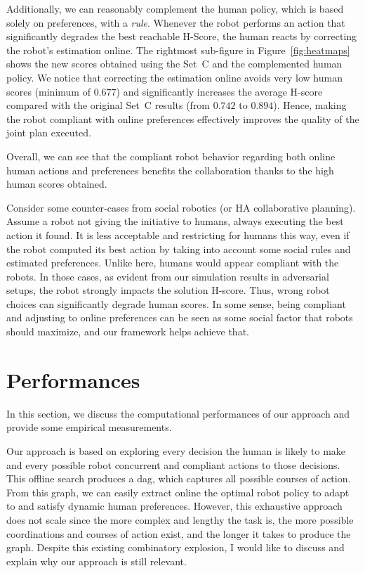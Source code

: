 Additionally, we can reasonably complement the human policy, which is based solely on preferences, with a \textit{rule}. Whenever the robot performs an action that significantly degrades the best reachable H-Score, the human reacts by correcting the robot's estimation online.
The rightmost sub-figure in Figure~\ref{fig:heatmaps} shows the new scores obtained using the Set~C and the complemented human policy. 
We notice that correcting the estimation online avoids very low human scores (minimum of $0.677$) and significantly increases the average H-score compared with the original Set~C results (from $0.742$ to $0.894$). Hence, making the robot compliant with online preferences effectively improves the quality of the joint plan executed.

Overall, we can see that the compliant robot behavior regarding both online human actions and preferences benefits the collaboration thanks to the high human scores obtained.

Consider some counter-cases from social robotics (or HA collaborative planning). Assume a robot not giving the initiative to humans, always executing the best action it found. 
It is less acceptable and restricting for humans this way, even if the robot computed its best action by taking into account some social rules and estimated preferences. 
Unlike here, humans would appear compliant with the robots. 
In those cases, as evident from our simulation results in adversarial setups, the robot strongly impacts the solution H-score. Thus, wrong robot choices can significantly degrade human scores. In some sense, being compliant and adjusting to online preferences can be seen as some social factor that robots should maximize, and our framework helps achieve that.

\section{Performances}


In this section, we discuss the computational performances of our approach and provide some empirical measurements. 

Our approach is based on exploring every decision the human is likely to make and every possible robot concurrent and compliant actions to those decisions. 
This offline search produces a \acrfull{dag}, which captures all possible courses of action. From this graph, we can easily extract online the optimal robot policy to adapt to and satisfy dynamic human preferences. However, this exhaustive approach does not scale since the more complex and lengthy the task is, the more possible coordinations and courses of action exist, and the longer it takes to produce the graph. Despite this existing combinatory explosion, I would like to discuss and explain why our approach is still relevant.


